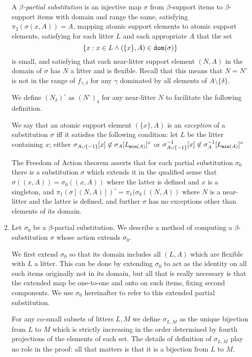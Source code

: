 \documentclass[12pt]{article}
\begin{document}
\begin{enumerate}
A {\em $\beta$-partial substitution\/} is an injective map $\sigma$ from $\beta$-support items to $\beta$-support items with domain and range the same, satisfying $\pi_2(\sigma(x,A)) = A$, mapping atomic support elements to atomic support elements, satisfying for each litter $L$ and each appropriate $A$ that the set $$\{x: x \in L \wedge (\{x\},A) \in {\tt dom}(\sigma)\}$$ is small, and satisfying that each near-litter support element $(N,A)$
in the domain of $\sigma$ has $N$ a litter and is flexible.  Recall that this means that $N=N^\circ$ is not in the range of $f_{\gamma,\delta}$ for any $\gamma$ dominated by all elements of $A \setminus \{\delta\}$.

We define $(N_\delta)^\circ$ as $(N^\circ)_\delta$ for any near-litter $N$ to facilitate the following definition.

 We say that an atomic support element $(\{x\},A)$ is an {\em exception\/} of a substitution $\sigma$ iff it satisfies the following condition:
let $L$ be the litter containing $x$; either $\sigma_{A \cup \{-1\}}[x] \not\in \sigma_A[L_{{\tt min}(A)}]^\circ$ or $\sigma^{-1}_{A \cup \{-1\}}[x] \not\in \sigma^{-1}_A[L_{{\tt min}(A)}]^\circ$

The Freedom of Action theorem asserts that for each partial substitution $\sigma_0$  there is a substitution $\sigma$ which extends it in the qualified sense that $\sigma((x,A)) =\sigma_0((x,A))$ where the latter is defined and $x$ is a singleton, and $\pi_1(\sigma[(N,A)])^\circ = \pi_1(\sigma_0((N,A))$ where $N$ is a near-litter and the latter is defined, and further $\sigma$ has no exceptions other than elements of its domain.

\item  Let $\sigma_0$ be a $\beta$-partial substitution.  We describe a method of computing a $\beta$-substitution $\sigma$ whose action extends $\sigma_0$.

We first extend $\sigma_0$ so that its domain includes all $(L,A)$ which are flexible with $L$ a litter.  This can be done by extending $\sigma_0$ to act as the identity on all such items originally not in its domain, but all that is really necessary is that the extended map be one-to-one and onto on such items, fixing second components.  We use $\sigma_0$ hereinafter to refer to this extended partial substitution.

For any co-small subsets of litters $L,M$ we define $\sigma_{L,M}$ as the unique bijection from $L$ to $M$ which is strictly increasing in the order determined by fourth projections of the elements of each set.  The details of definition of $\sigma_{L,M}$ play no role in the proof: all that matters is that it is a bijection from $L$ to $M$.


\end{enumerate}
\end{document}
